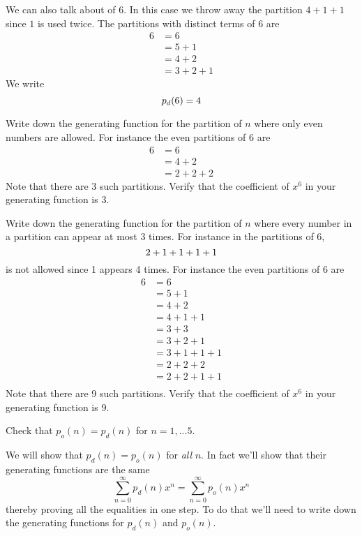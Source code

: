 We can also talk about  of $6$.
In this case we throw away the partition $4 + 1 + 1$ since $1$ is used twice.
The partitions with distinct terms of 6 are
\begin{align*}
6
&= 6 \\
&= 5 + 1\\
&= 4 + 2 \\
&= 3 + 2 + 1 
\end{align*}
We write
\[
p_d(6) = 4\index{pd@$p_d(n)$}
\]


\newpage
\begin{ex}
Write down the generating function for the partition of $n$ where
only even numbers are allowed.
For instance the even partitions of 6 are
\begin{align*}
6
&= 6 \\
&= 4 + 2 \\
&= 2 + 2 + 2 
\end{align*}
Note that there are 3 such partitions.
Verify that the coefficient of $x^6$ in your generating function is 3.
\end{ex}


\newpage
\begin{ex}
Write down the generating function for the partition of $n$ where
every number in a partition can appear at most 3 times.
For instance in the partitions of $6$,
\[
2 + 1 + 1 + 1 + 1 \\
\]
is not allowed since 1 appears 4 times.
For instance the even partitions of 6 are
\begin{align*}
6
&= 6 \\
&= 5 + 1\\
&= 4 + 2 \\
&= 4 + 1 + 1 \\
&= 3 + 3 \\
&= 3 + 2 + 1 \\
&= 3 + 1 + 1 + 1 \\
&= 2 + 2 + 2 \\
&= 2 + 2 + 1 + 1 \\
\end{align*}
Note that there are 9 such partitions.
Verify that the coefficient of $x^6$ in your generating function is 9.
\end{ex}


\newpage
\begin{ex}
Check that $p_o(n) = p_d(n)$ for $n = 1, ... 5$.
\end{ex}


\newpage
We will show that $p_d(n) = p_o(n)$ for \textit{all} $n$.
In fact we'll show that their generating functions are the same
\[
\sum_{n=0}^\infty p_d(n) x^n = 
\sum_{n=0}^\infty p_o(n) x^n 
\]
thereby proving all the equalities in one step.
To do that we'll need to write down the generating functions for $p_d(n)$
and $p_o(n)$.

